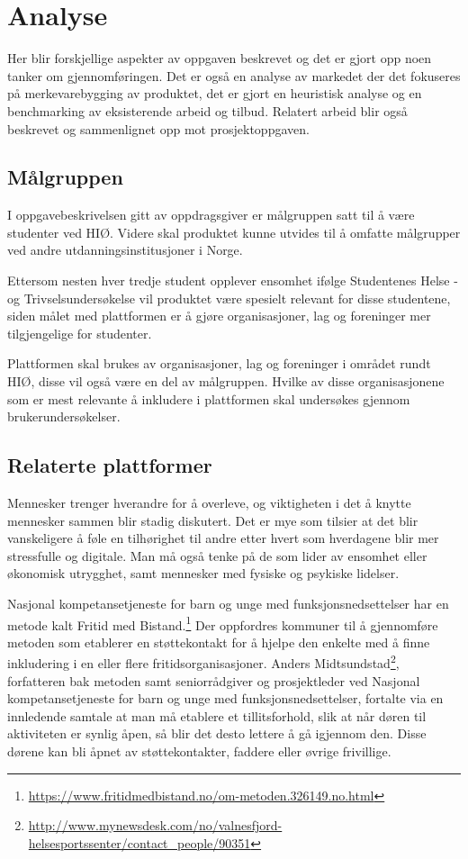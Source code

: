 \section{Analyse}
Her blir forskjellige aspekter av oppgaven beskrevet og det er gjort opp noen tanker om gjennomføringen. Det er også en analyse av markedet der det fokuseres på merkevarebygging av produktet, det er gjort en heuristisk analyse og en benchmarking av eksisterende arbeid og tilbud. Relatert arbeid blir også beskrevet og sammenlignet opp mot prosjektoppgaven.

\subsection{Målgruppen}
I oppgavebeskrivelsen gitt av oppdragsgiver er målgruppen satt til å være studenter ved HIØ. Videre skal produktet kunne utvides til å omfatte målgrupper ved andre utdanningsinstitusjoner i Norge. 

Ettersom nesten hver tredje student opplever ensomhet ifølge Studentenes Helse -og Trivselsundersøkelse \cite{SHOT:2} vil produktet være spesielt relevant for disse studentene, siden målet med plattformen er å gjøre organisasjoner, lag og foreninger mer tilgjengelige for studenter.

Plattformen skal brukes av organisasjoner, lag og foreninger i området rundt HIØ, disse vil også være en del av målgruppen. Hvilke av disse organisasjonene som er mest relevante å inkludere i plattformen skal undersøkes gjennom brukerundersøkelser.

\subsection{Relaterte plattformer}

Mennesker trenger hverandre for å overleve, og viktigheten i det å knytte mennesker sammen blir stadig diskutert. Det er mye som tilsier at det blir vanskeligere å føle en tilhørighet til andre etter hvert som hverdagene blir mer stressfulle og digitale. Man må også tenke på de som lider av ensomhet eller økonomisk utrygghet, samt mennesker med fysiske og psykiske lidelser.

\vspace{5mm} %
Nasjonal kompetansetjeneste for barn og unge med funksjonsnedsettelser har en metode kalt Fritid med Bistand.\footnote{\url{https://www.fritidmedbistand.no/om-metoden.326149.no.html}} Der oppfordres kommuner til å gjennomføre metoden som etablerer en støttekontakt for å hjelpe den enkelte med å finne inkludering i en eller flere fritidsorganisasjoner. Anders Midtsundstad\footnote{\url{http://www.mynewsdesk.com/no/valnesfjord-helsesportssenter/contact_people/90351}},  
 forfatteren bak metoden samt seniorrådgiver og prosjektleder ved Nasjonal kompetansetjeneste for barn og unge med funksjonsnedsettelser, fortalte via en innledende samtale at man må etablere et tillitsforhold, slik at når døren til aktiviteten er synlig åpen, så blir det desto lettere å gå igjennom den. Disse dørene kan bli åpnet av støttekontakter, faddere eller øvrige frivillige. 

